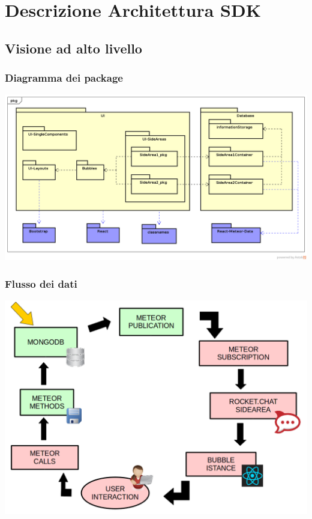 
\section{Descrizione Architettura SDK}
\subsection{Visione ad alto livello}
\begin{frame}
  \frametitle{Diagramma dei package}
  \begin{center}
    \includegraphics[scale=0.30]{img/General.png}
  \end{center}
\end{frame}


\begin{frame}
  \frametitle{Flusso dei dati }
  \begin{center}
    \includegraphics[scale=0.30]{img/2flussodati.png}
  \end{center}
\end{frame}


